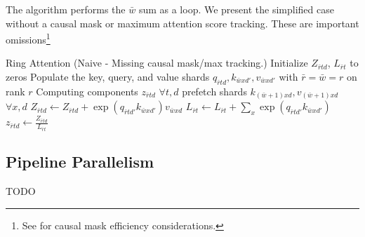 The algorithm performs the $ \bar{w}$ sum as a loop. We present the simplified case without a causal
mask or maximum attention score tracking. These are important omissions\footnote{See
\cite{brandon2023stripedattentionfasterring} for causal mask efficiency considerations.}
\begin{algo}{Ring Attention (Naive - Missing causal mask/max tracking.)}
\State Initialize $ Z _{ \bar{r}td } $, $ L _{ \bar{r}t } $ to zeros
\State Populate the key, query, and value shards $ q _{ \bar{r}td },k _{ \bar{w}x d' },v _{ \bar{w}x d' } $ with $ \bar{r} =  \bar{w} = r $ on rank $ r $
 \Comment Computing components $ z _{ \bar{r}td } $ $ \forall t, d $
     prefetch shards $ k _{ (\bar{w}+1)xd }, v _{ (\bar{w}+1)xd } $ $ \forall x,d $
    \EndIf
    \State $ Z _{ \bar{r}td } \gets Z _{ \bar{r}td }+   \exp \left ( q _{ \bar{r}t d' } k _{ \bar{w}x d' } \right ) v _{ \bar{w}xd } $
    \State $ L _{ \bar{r}t } \gets  L _{ \bar{r}t } +  \sum _{ x } \exp \left ( q _{ \bar{r}t d' } k _{ \bar{w}x d' } \right )  $
\EndFor
\State $ z _{ \bar{r}td } \gets \frac{ Z _{ \bar{r}td } }{ L _{ \bar{r}t }  }$
\label{algo_ring_attn_fwd_naive}
\end{algo}



\subsection{Pipeline Parallelism \label{subsec_pipe_parallelism}}

TODO

